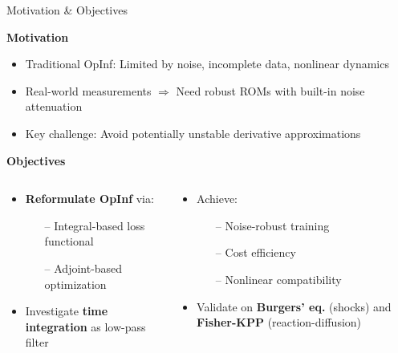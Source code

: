 \begin{frame}{Motivation \& Objectives}

\textbf{Motivation}
\begin{itemize}
    \item Traditional OpInf: Limited by noise, incomplete data, nonlinear dynamics
    \item Real-world measurements $\Rightarrow$ Need robust ROMs with built-in noise attenuation
    \item Key challenge: Avoid potentially unstable derivative approximations
\end{itemize}

\vspace{0.3cm}

\textbf{Objectives}
\begin{columns}[T]
\begin{column}{0.48\textwidth}
\begin{itemize}
    \item \textbf{Reformulate OpInf} via:
    \begin{itemize}
        \item[--] Integral-based loss functional
        \item[--] Adjoint-based optimization
    \end{itemize}
    \item Investigate \textbf{time integration} as low-pass filter
\end{itemize}
\end{column}
\begin{column}{0.48\textwidth}
\begin{itemize}
    \item Achieve:
    \begin{itemize}
        \item[--] Noise-robust training
        \item[--] Cost efficiency
        \item[--] Nonlinear compatibility
    \end{itemize}
    \item Validate on \textbf{Burgers' eq.} (shocks) and \textbf{Fisher-KPP} (reaction-diffusion)
\end{itemize}
\end{column}
\end{columns}

\end{frame}

